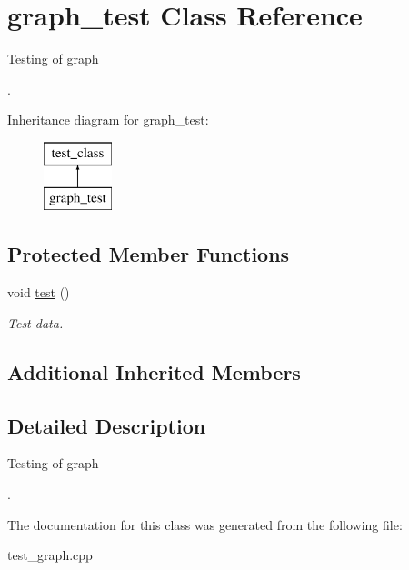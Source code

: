 \hypertarget{classgraph__test}{\section{graph\+\_\+test Class Reference}
\label{classgraph__test}
}


Testing of graph \begin{DoxyVerb}\end{DoxyVerb}
.  


Inheritance diagram for graph\+\_\+test\+:\begin{figure}[H]
\begin{center}
\leavevmode
\includegraphics[height=2.000000cm]{classgraph__test}
\end{center}
\end{figure}
\subsection*{Protected Member Functions}
\begin{DoxyCompactItemize}
\item 
\hypertarget{classgraph__test_a5847cc3b842a645429000de955f17efc}{void \hyperlink{classgraph__test_a5847cc3b842a645429000de955f17efc}{test} ()}\label{classgraph__test_a5847cc3b842a645429000de955f17efc}

\begin{DoxyCompactList}\small\item\em Test data. \end{DoxyCompactList}\end{DoxyCompactItemize}
\subsection*{Additional Inherited Members}


\subsection{Detailed Description}
Testing of graph \begin{DoxyVerb}\end{DoxyVerb}
. 

The documentation for this class was generated from the following file\+:\begin{DoxyCompactItemize}
\item 
test\+\_\+graph.\+cpp\end{DoxyCompactItemize}
